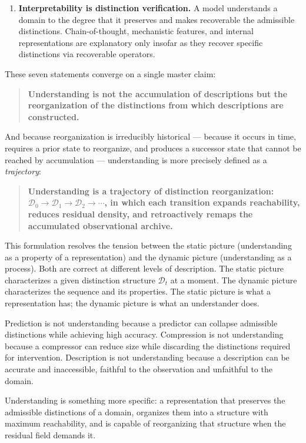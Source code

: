\documentclass[11pt, a4paper]{article}
\theoremstyle{plain}
\theoremstyle{definition}
\theoremstyle{remark}
\newcommand{\Dist}{\mathcal{D}}
\begin{document}
\begin{enumerate}
  \item \textbf{Interpretability is distinction verification.}
        A model understands a domain to the degree that it preserves
        and makes recoverable the admissible distinctions.
        Chain-of-thought, mechanistic features, and internal
        representations are explanatory only insofar as they
        recover specific distinctions via recoverable operators.
\end{enumerate}

These seven statements converge on a single master claim:

\begin{quote}
\textbf{Understanding is not the accumulation of descriptions but
the reorganization of the distinctions from which descriptions
are constructed.}
\end{quote}

And because reorganization is irreducibly historical --- because
it occurs in time, requires a prior state to reorganize, and
produces a successor state that cannot be reached by accumulation
--- understanding is more precisely defined as a \emph{trajectory}:

\begin{quote}
\textbf{Understanding is a trajectory of distinction reorganization:
$\Dist_0 \to \Dist_1 \to \Dist_2 \to \cdots$,
in which each transition expands reachability, reduces residual density,
and retroactively remaps the accumulated observational archive.}
\end{quote}

This formulation resolves the tension between the static picture
(understanding as a property of a representation) and the dynamic
picture (understanding as a process). Both are correct at different
levels of description. The static picture characterizes a given
distinction structure $\Dist_t$ at a moment. The dynamic picture
characterizes the sequence and its properties. The static picture
is what a representation has; the dynamic picture is what an
understander does.

Prediction is not understanding because a predictor can collapse
admissible distinctions while achieving high accuracy.
Compression is not understanding because a compressor can reduce
size while discarding the distinctions required for intervention.
Description is not understanding because a description can be
accurate and inaccessible, faithful to the observation and
unfaithful to the domain.

Understanding is something more specific: a representation that
preserves the admissible distinctions of a domain, organizes them
into a structure with maximum reachability, and is capable of
reorganizing that structure when the residual field demands it.
\end{document}
